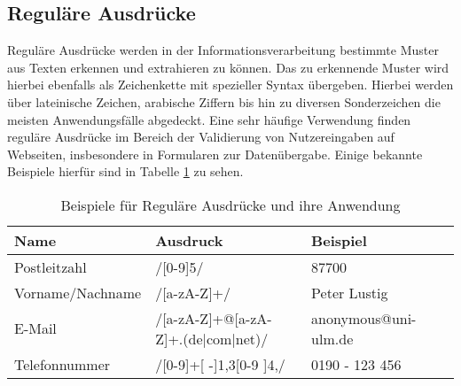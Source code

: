\subsection{Reguläre Ausdrücke	}
Reguläre Ausdrücke werden in der Informationsverarbeitung bestimmte Muster aus Texten erkennen und extrahieren zu können. Das zu erkennende Muster wird hierbei ebenfalls als Zeichenkette mit spezieller Syntax übergeben. Hierbei werden über lateinische Zeichen, arabische Ziffern bis hin zu diversen Sonderzeichen die meisten Anwendungsfälle abgedeckt.
Eine sehr häufige Verwendung finden reguläre Ausdrücke im Bereich der Validierung von Nutzereingaben auf Webseiten, insbesondere in Formularen zur Datenübergabe. Einige bekannte Beispiele hierfür sind in Tabelle  \ref{tabelle} zu sehen.
\newline
\begin{table}
\begin{tabular}{llll}
\hline
Name & Ausdruck & Beispiel \\
\hline
Postleitzahl & /[0-9]{5}/ & 87700 \\
Vorname/Nachname & /[a-zA-Z]+/ & Peter Lustig \\
E-Mail & /[a-zA-Z]+@[a-zA-Z]+.(de|com|net)/ & anonymous@uni-ulm.de \\
Telefonnummer & /[0-9]+[ -]{1,3}[0-9 ]{4,}/ & 0190 - 123 456 \\
\hline
\end{tabular}
\caption{\label{tabelle} Beispiele für Reguläre Ausdrücke und ihre Anwendung}
\end{table}

